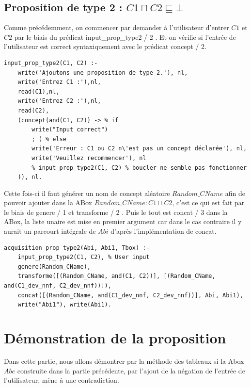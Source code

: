 \documentclass{article}
\begin{document}
\subsection{Proposition de type 2 : $ C1 \sqcap C2 \sqsubseteq \bot $ }
Comme précédemment, on commencer par demander à l'utilisateur d'entrer $ C1 $ et $ C2 $ par le biais du prédicat \color{blue} input\_prop\_type2 / 2 \color{black}. Et on vérifie si l'entrée de l'utilisateur est correct syntaxiquement avec le prédicat \color{blue}concept / 2\color{black}.
\begin{verbatim}
input_prop_type2(C1, C2) :-
    write('Ajoutons une proposition de type 2.'), nl,
    write('Entrez C1 :'),nl, 
    read(C1),nl,
    write('Entrez C2 :'),nl, 
    read(C2),
    (concept(and(C1, C2)) -> % if 
        write("Input correct")
        ; ( % else
        write('Erreur : C1 ou C2 n\'est pas un concept déclarée'), nl,
        write('Veuillez recommencer'), nl
        % input_prop_type2(C1, C2) % boucler ne semble pas fonctionner
    )), nl.
\end{verbatim}
Cette fois-ci il faut générer un nom de concept aléatoire $ Random\_CName $ afin de pouvoir ajouter dans la ABox $ Random\_CName : C1 \sqcap C2 $, c'est ce qui est fait par le biais de \color{blue} genere / 1 \color{black} et \color{blue} transforme / 2 \color{black}. Puis le tout est \color{blue} concat / 3 \color{black} dans la ABox, la liste unaire est mise en premier argument car dans le cas contraire il y aurait un parcourt intégrale de $Abi$ d'après l'implémentation de \color{blue}concat\color{black}.
\begin{verbatim}
acquisition_prop_type2(Abi, Abi1, Tbox) :- 
    input_prop_type2(C1, C2), % User input
    genere(Random_CName),
    transforme([(Random_CName, and(C1, C2))], [(Random_CName, and(C1_dev_nnf, C2_dev_nnf))]), 
    concat([(Random_CName, and(C1_dev_nnf, C2_dev_nnf))], Abi, Abi1), 
    write("Abi1"), write(Abi1).
\end{verbatim}

\section{Démonstration de la proposition}
Dans cette partie, nous allons démontrer par la méthode des tableaux si la Abox $ Abe $ construite dans la partie précédente, par l'ajout de la négation de l'entrée de l'utilisateur, mène à une contradiction.
\end{document}

